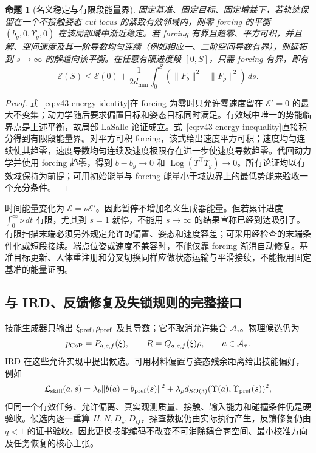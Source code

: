 \documentclass[11pt,a4paper]{article}
\numberwithin{equation}{section}
\newtheorem{proposition}[theorem]{命题}
\theoremstyle{definition}
\begin{document}
\begin{proposition}[名义稳定与有限段能量界]
\label{prop:v43-nominal-skill}
固定基准、固定目标、固定增益下，若轨迹保留在一个不接触姿态 cut locus 的紧致有效邻域内，则零 forcing 的平衡 $(b_g,0,\Upsilon_g,0)$ 在该局部域中渐近稳定。若 forcing 有界且趋零、平方可积，并且解、空间速度及其一阶导数均匀连续（例如相应一、二阶空间导数有界），则延拓到 $s\to\infty$ 的解趋向该平衡。在任意有限进度段 $[0,S]$，只需 forcing 有界，即有
\begin{equation}
 \mathcal E(S)\le\mathcal E(0)+
  \frac1{2d_{\min}}\int_0^S
     (\|F_b\|^2+\|F_\rho\|^2)\,ds.
 \label{eq:v43-finite-energy}
\end{equation}
\end{proposition}
\begin{proof}
式~\eqref{eq:v43-energy-identity}在 forcing 为零时只允许零速度留在 $\mathcal E'=0$ 的最大不变集；动力学随后要求偏置目标和姿态目标同时满足。有效域中唯一的势能临界点是上述平衡，故局部 LaSalle 论证成立。式~\eqref{eq:v43-energy-inequality}直接积分得到有限段能量界。对平方可积 forcing，该式给出速度平方可积；速度均匀连续使其趋零，速度导数均匀连续及速度极限存在进一步使速度导数趋零。代回动力学并使用 forcing 趋零，得到 $b-b_g\to0$ 和 $\operatorname{Log}(\Upsilon^\top\Upsilon_g)\to0$。所有论证均以有效域保持为前提；可用初始能量与 forcing 能量小于域边界上的最低势能来验收一个充分条件。
\end{proof}

时间能量变化为 $\dot{\mathcal E}=\nu\mathcal E'$。因此暂停不增加名义生成器能量。但若累计进度 $\int_0^\infty\nu\,dt$ 有限，尤其到 $s=1$ 就停，不能用 $s\to\infty$ 的结果宣称已经到达吸引子。有限扫描末端必须另外规定允许的偏置、姿态和速度容差；可采用经检查的末端条件化或短段接续。端点位姿或速度不兼容时，不能仅靠 forcing 渐消自动修复。基准目标更新、人体重注册和分叉切换同样应做状态运输与平滑接续，不能搬用固定基准的能量证明。

\subsection{与 IRD、反馈修复及失锁规则的完整接口}
技能生成器只输出 $\xi_{\rm pref},\rho_{\rm pref}$ 及其导数；它不取消允许集合 $\mathcal A_\tau$。物理候选仍为
\begin{equation}
 p_{\rm CoP}=P_{a,c,f}(\xi),\qquad
 R=Q_{a,c,f}(\xi)\rho,\qquad a\in\mathcal A_\tau.
\end{equation}
IRD 在这些允许实现中提出候选。可用材料偏置与姿态残余距离给出技能偏好，例如
\begin{equation}
 \mathcal L_{\rm skill}(a,s)=
 \lambda_b\|b(a)-b_{\rm pref}(s)\|^2+
 \lambda_\rho d_{SO(3)}(\Upsilon(a),\Upsilon_{\rm pref}(s))^2,
 \label{eq:v43-skill-preference}
\end{equation}
但同一个有效任务、允许偏离、真实观测质量、接触、输入能力和碰撞条件仍是硬验收。候选内逐一重算 $H,N,D_\star,D_Q$，探查数据仍由实际执行产生，反馈修复仍由 $q<1$ 的证书验收。因此更换技能编码不改变不可消除耦合商空间、最小校准方向及任务恢复的核心主张。
\end{document}
